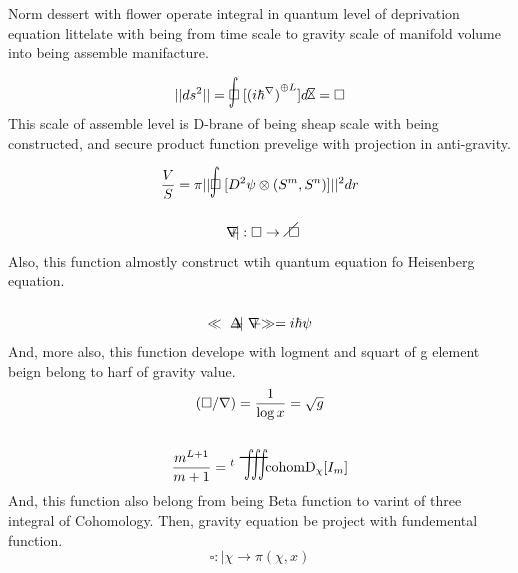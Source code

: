 \documentclass{jsarticle}
\begin{document}
 
  \newcommand{\whitewithblack}{\text{\textcircled{\textbullet}}}
  \newcommand{\whitewithblacksquare}{\text{\fbox{\text{\rule{0.5em}
  {0.5em}}}}}
  \newcommand{\whitewithwhitesquare}{\text{\fbox{\text{\phantom
  {\rule{0.5em}{0.5em}}}}}}
 \newcommand{\whitewithbodercircleiiint}{%
	 \begin{picture}(30,45)
		 \put(0,0){\scalebox{2.0}[2]{$\whitewithbodercircle$}}
		 \put(0,0){\scalebox{2.0}[2]{$\iiint$}}
	 \end{picture}%
	 }
\newcommand{\whitewithbodercircleint}{%
	 \begin{picture}(30,45)
		 \put(0,0){\scalebox{2.0}[2]{$\whitewithbodercircle$}}
		 \put(0,0){\scalebox{2.0}[2]{$\int$}}
	 \end{picture}%
	 }
 \newcommand{\whitewithbodercirclevarint}{%
	 \begin{picture}(30,45)
		 \put(0,0){\scalebox{2.0}[2]{$\whitewithbodercircle$}}
		 \put(0,0){\scalebox{2.0}[2]{$\varint$}}
	 \end{picture}%
	 }
 
 \newcommand{\whitewithbodercirclevariiint}{%
	 \begin{picture}(30,45)
		 \put(0,0){\scalebox{2.0}[2]{$\whitewithbodercircle$}}
		 \put(0,0){\scalebox{2.0}[2]{$\variiint$}}
	 \end{picture}%
	 }
 
 \newcommand{\average}{%
	  \begin{picture}(30,45)
		  \put(0,0){\scalebox{2.0}[2]{$\square$}}
		  \put(4,4){$\setminus$}
	  \end{picture}%
  } 
 
 \newcommand{\flowerletter}{%
	 \begin{picture}(10,20)
		 \put(0,0){$\text{\scalebox{1.0}[1]{$\square$}}$}
		 \put(0,0){$\text{\scalebox{1.0}[2]{$\int$}}$}
	 \end{picture} %
	 }

  Norm dessert with flower operate integral in quantum level of
  deprivation equation littelate with being from time scale to gravity
  scale of manifold volume into being assemble manifacture.
$$ ||ds^2|| = \flowerletter [{(i\hbar^{\nabla})}^{\oplus L}] d\timebow
= \square $$
This scale of assemble level is D-brane of being sheap scale with being
constructed, and secure product function prevelige with projection in
anti-gravity.
$$ {V \over S} = \pi ||\flowerletter [D^{2}\psi \otimes 
{(S^{m},S^{n})}]||^{2} dr $$
$$ \secproduct |: \square \to \alearletter $$
Also, this function almostly construct wtih quantum equation fo
Heisenberg equation.
$$ \ll \deltasecproduct | \secproduct \gg = i\hbar \psi $$
And, more also, this function develope with logment and squart of g element
beign belong to harf of gravity value.
$$ (\square / \nabla ) = {1 \over {\log x}} = \sqrt{g} $$
$$ {{m^{L+1}} \over {m + 1}} = {}^{t}\scalebox{1.0}[2]{\variiint} \mathrm{
	cohom D_{\chi}}[I_m] $$
And, this function also belong from being Beta function to varint of 
three integral of Cohomology.
Then, gravity equation be project with fundemental function.
$$ \square :| \chi \to \pi(\chi,x) $$
\end{document}
